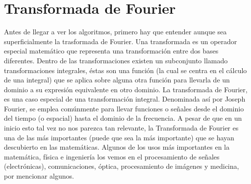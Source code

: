 \documentclass{report}
\begin{document}
\clearpage
\section*{Transformada de Fourier}
\noindent Antes de llegar a ver los algoritmos, primero hay que entender aunque sea superficialmente la trasformada de Fourier. Una transformada es un operador especial matemático que representa una transformación entre dos bases diferentes. Dentro de las transformaciones existen un subconjunto llamado transformaciones integrales, éstas son una función (la cual se centra en el cálculo de una integral) que se aplica sobre alguna otra función para llevarla de un dominio a su expresión equivalente en otro dominio. La transformada de Fourier, es una caso especial de una transformación integral. Denominada así por Joseph Fourier, se emplea comúnmente para llevar funciones o señales desde el dominio del tiempo (o espacial) hasta el dominio de la frecuencia. A pesar de que en un inicio esto tal vez no nos parezca tan relevante, la Transformada de Fourier es una de las más importantes (puede que sea la más importante) que se hayan descubierto en las matemáticas. Algunos de los usos más importantes en la matemática, física e ingeniería los vemos en el procesamiento de señales (electrónicas), comunicaciones, óptica, procesamiento de imágenes y medicina, por mencionar algunos.\medskip 
\end{document}
